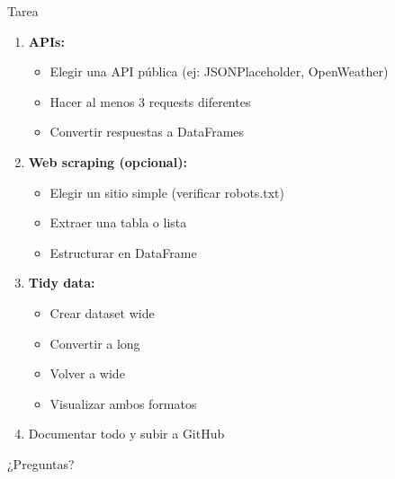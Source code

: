\documentclass[aspectratio=169]{beamer}
\begin{document}
\begin{frame}{Tarea}
\begin{enumerate}
    \item \textbf{APIs:}
    \begin{itemize}
        \item Elegir una API pública (ej: JSONPlaceholder, OpenWeather)
        \item Hacer al menos 3 requests diferentes
        \item Convertir respuestas a DataFrames
    \end{itemize}
    
    \item \textbf{Web scraping (opcional):}
    \begin{itemize}
        \item Elegir un sitio simple (verificar robots.txt)
        \item Extraer una tabla o lista
        \item Estructurar en DataFrame
    \end{itemize}
    
    \item \textbf{Tidy data:}
    \begin{itemize}
        \item Crear dataset wide
        \item Convertir a long
        \item Volver a wide
        \item Visualizar ambos formatos
    \end{itemize}
    
    \item Documentar todo y subir a GitHub
\end{enumerate}
\end{frame}

\begin{frame}[standout]
\Huge ¿Preguntas?
\end{frame}
\end{document}
